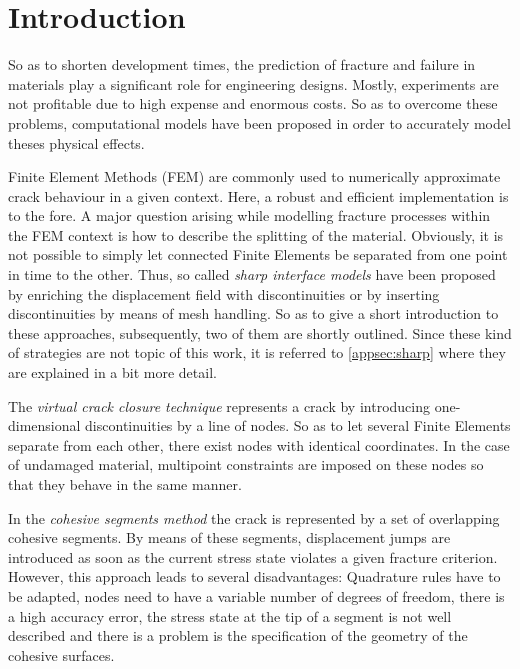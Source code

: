 \section{Introduction} \label{sec:intro}

So as to shorten development times, the prediction of fracture and failure in materials play a significant role for engineering designs. Mostly, experiments are not profitable due to high expense and enormous costs. So as to overcome these problems, computational models have been proposed in order to accurately model theses physical effects. 

Finite Element Methods (FEM) are commonly used to numerically approximate crack behaviour in a given context. Here, a robust and efficient implementation is to the fore. A major question arising while modelling fracture processes within the FEM context is how to describe the splitting of the material. Obviously, it is not possible to simply let connected Finite Elements be separated from one point in time to the other. Thus, so called \textit{sharp interface models} have been proposed by enriching the displacement field with discontinuities or by inserting discontinuities by means of mesh handling. So as to give a short introduction to these approaches, subsequently, two of them are shortly outlined. Since these kind of strategies are not topic of this work, it is referred to \ref{appsec:sharp} where they are explained in a bit more detail.

The \textit{virtual crack closure technique} represents a crack by introducing one-dimensional discontinuities by a line of nodes. So as to let several Finite Elements separate from each other, there exist nodes with identical coordinates. In the case of undamaged material, multipoint constraints are imposed on these nodes so that they behave in the same manner. \cite{03_SotA_virtClos} 

In the \textit{cohesive segments method} the crack is represented by a set of overlapping cohesive segments. By means of these segments, displacement jumps are introduced as soon as the current stress state violates a given fracture criterion. However, this approach leads to several disadvantages: Quadrature rules have to be adapted, nodes need to have a variable number of degrees of freedom, there is a high accuracy error, the stress state at the tip of a segment is not well described and there is a problem is the specification of the geometry of the cohesive surfaces. \cite{02_SotA_cohes}\cite{01_SotA_cohes_dyn}

